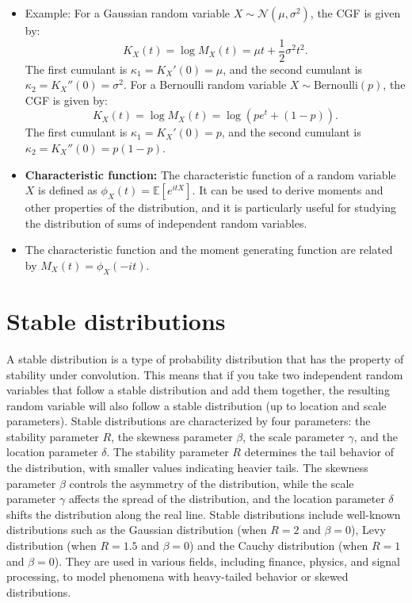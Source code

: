 \documentclass[12pt]{article}
\def\alpha{R}
\begin{document}
\begin{singlespace}
\begin{itemize}
    The reason for using cumulants instead of moments is that cumulants have properties that make them more suitable for certain applications, such as in the study of distributions and their convergence. Further, the reason $K_X(t) = \log M_X(t)$ is that the logarithm of the MGF transforms the product of MGFs (which corresponds to the sum of independent random variables) into a sum of CGFs, making it easier to analyze the behavior of sums of random variables. Additionally, the CGF can provide insights into the tail behavior and other properties of the distribution that may not be as easily accessible through moments alone.
    \item  Example: For a Gaussian random variable $X \sim \mathcal{N}(\mu, \sigma^2)$, the CGF is given by:
    \[
    K_X(t) = \log M_X(t) = \mu t + \frac{1}{2} \sigma^2 t^2.
    \] The first cumulant is $\kappa_1 = K_X'(0) = \mu$, and the second cumulant is $\kappa_2 = K_X''(0) = \sigma^2$. For a Bernoulli random variable $X \sim \text{Bernoulli}(p)$, the CGF is given by:
    \[
    K_X(t) = \log M_X(t) = \log(p e^t + (1-p)).
    \] The first cumulant is $\kappa_1 = K_X'(0) = p$, and the second cumulant is $\kappa_2 = K_X''(0) = p(1-p)$.
    \item \textbf{Characteristic function:} The characteristic function of a random variable $X$ is defined as $\phi_X(t) = \mathbb{E}[e^{itX}]$. It can be used to derive moments and other properties of the distribution, and it is particularly useful for studying the distribution of sums of independent random variables.
    \item The characteristic function and the moment generating function are related by $M_X(t) = \phi_X(-it)$.
\end{itemize}

\section{Stable distributions}
A stable distribution is a type of probability distribution that has the property of stability under convolution. This means that if you take two independent random variables that follow a stable distribution and add them together, the resulting random variable will also follow a stable distribution (up to location and scale parameters). Stable distributions are characterized by four parameters: the stability parameter $\alpha$, the skewness parameter $\beta$, the scale parameter $\gamma$, and the location parameter $\delta$. The stability parameter $\alpha$ determines the tail behavior of the distribution, with smaller values indicating heavier tails. The skewness parameter $\beta$ controls the asymmetry of the distribution, while the scale parameter $\gamma$ affects the spread of the distribution, and the location parameter $\delta$ shifts the distribution along the real line. Stable distributions include well-known distributions such as the Gaussian distribution (when $\alpha=2$ and $\beta=0$), Levy distribution (when $\alpha=1.5$ and $\beta=0$) and the Cauchy distribution (when $\alpha=1$ and $\beta=0$). They are used in various fields, including finance, physics, and signal processing, to model phenomena with heavy-tailed behavior or skewed distributions.


\end{singlespace}
\end{document}
